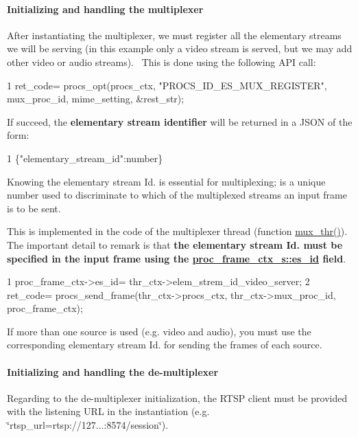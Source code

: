 \paragraph*{Initializing and handling the multiplexer}

After instantiating the multiplexer, we must register all the elementary streams we will be serving (in this example only a video stream is served, but we may add other video or audio streams).~\newline
 This is done using the following A\+PI call\+: 
\begin{DoxyCode}
1 ret\_code= procs\_opt(procs\_ctx, "PROCS\_ID\_ES\_MUX\_REGISTER", mux\_proc\_id, mime\_setting, &rest\_str);
\end{DoxyCode}
 If succeed, the {\bfseries elementary stream identifier} will be returned in a J\+S\+ON of the form\+: 
\begin{DoxyCode}
1 \{"elementary\_stream\_id":number\}
\end{DoxyCode}
 Knowing the elementary stream Id. is essential for multiplexing; is a unique number used to discriminate to which of the multiplexed streams an input frame is to be sent.~\newline


This is implemented in the code of the multiplexer thread (function \textquotesingle{}\hyperlink{codecs__muxers__loopback_8c_a494104de8b24b4783b3e8de4609c761e}{mux\+\_\+thr()}\textquotesingle{}). The important detail to remark is that {\bfseries the elementary stream Id. must be specified in the input frame using the \hyperlink{structproc__frame__ctx__s_a457dcb8ae6440506054f07483f48be1f}{proc\+\_\+frame\+\_\+ctx\+\_\+s\+::es\+\_\+id} field}. 
\begin{DoxyCode}
1 proc\_frame\_ctx->es\_id= thr\_ctx->elem\_strem\_id\_video\_server;
2 ret\_code= procs\_send\_frame(thr\_ctx->procs\_ctx, thr\_ctx->mux\_proc\_id, proc\_frame\_ctx);
\end{DoxyCode}
 If more than one source is used (e.\+g. video and audio), you must use the corresponding elementary stream Id. for sending the frames of each source.

\paragraph*{Initializing and handling the de-\/multiplexer}

Regarding to the de-\/multiplexer initialization, the R\+T\+SP client must be provided with the listening U\+RL in the instantiation (e.\+g. \char`\"{}rtsp\+\_\+url=rtsp\+://127...\+:8574/session\char`\"{}).


